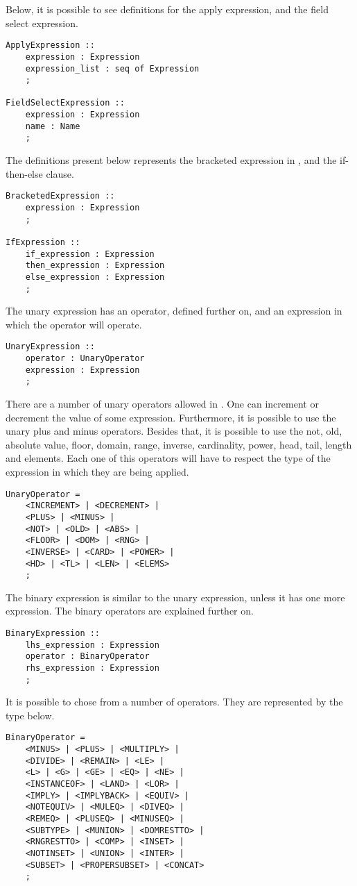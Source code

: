 \medskip
Below, it is possible to see definitions for the apply expression, and the field select expression.
\medskip
\begin{lstlisting}
ApplyExpression ::
    expression : Expression
	expression_list : seq of Expression
	;

FieldSelectExpression ::
    expression : Expression
	name : Name
	;
\end{lstlisting}
\medskip
The definitions present below represents the bracketed expression in \jml, and the if-then-else clause.
\medskip
\begin{lstlisting}
BracketedExpression ::
	expression : Expression
	;
	
IfExpression ::
	if_expression : Expression
	then_expression : Expression
	else_expression : Expression
	;
\end{lstlisting}
\medskip
The unary expression has an operator, defined further on, and an expression in which the operator will operate.
\medskip
\begin{lstlisting}	
UnaryExpression ::
	operator : UnaryOperator
	expression : Expression
	;
\end{lstlisting}
\medskip
There are a number of unary operators allowed in \jml. One can increment or decrement the value of some expression. Furthermore, it is possible to use the unary plus and minus operators. Besides that, it is possible to use the not, old, absolute value, floor, domain, range, inverse, cardinality, power, head, tail, length and elements. Each one of this operators will have to respect the type of the expression in which they are being applied. 
\medskip
\begin{lstlisting}
UnaryOperator =
	<INCREMENT> | <DECREMENT> | 
	<PLUS> | <MINUS> |
	<NOT> | <OLD> | <ABS> |
	<FLOOR> | <DOM> | <RNG> |
	<INVERSE> | <CARD> | <POWER> |
	<HD> | <TL> | <LEN> | <ELEMS>
	;
\end{lstlisting}
\medskip
The binary expression is similar to the unary expression, unless it has one more expression. The binary operators are explained further on.
\medskip
\begin{lstlisting}
BinaryExpression :: 
	lhs_expression : Expression
	operator : BinaryOperator
	rhs_expression : Expression
	;
\end{lstlisting}
\medskip
It is possible to chose from a number of operators. They are represented by the type below. 
\medskip
\begin{lstlisting}
BinaryOperator = 
	<MINUS> | <PLUS> | <MULTIPLY> |
	<DIVIDE> | <REMAIN> | <LE> |
	<L> | <G> | <GE> | <EQ> | <NE> |
	<INSTANCEOF> | <LAND> | <LOR> |
	<IMPLY> | <IMPLYBACK> | <EQUIV> |
	<NOTEQUIV> | <MULEQ> | <DIVEQ> | 
    <REMEQ> | <PLUSEQ> | <MINUSEQ> |
	<SUBTYPE> | <MUNION> | <DOMRESTTO> |
	<RNGRESTTO> | <COMP> | <INSET> |
	<NOTINSET> | <UNION> | <INTER> |
	<SUBSET> | <PROPERSUBSET> | <CONCAT>
	;
\end{lstlisting}

